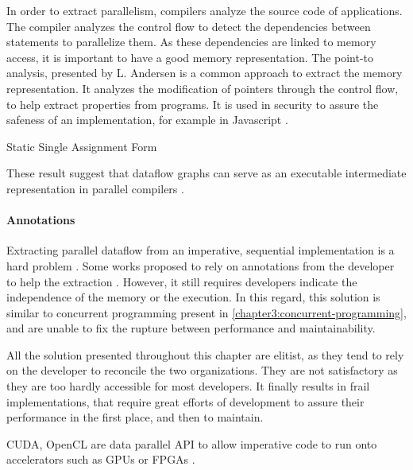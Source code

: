 In order to extract parallelism, compilers analyze the source code of applications.
The compiler analyzes the control flow to detect the dependencies between statements to parallelize them.
As these dependencies are linked to memory access, it is important to have a good memory representation.
The point-to analysis, presented by L. Andersen \cite{Andersen1994} is a common approach to extract the memory representation.
It analyzes the modification of pointers through the control flow, to help extract properties from programs.
It is used in security to assure the safeness of an implementation, for example in Javascript \cite{Chudnov2015}.


Static Single Assignment Form

These result suggest that dataflow graphs can serve as an executable intermediate representation in parallel compilers \cite{Beck1991}.


\paragraph{Annotations}

Extracting parallel dataflow from an imperative, sequential implementation is a hard problem \cite{Johnston2004a}.
Some works proposed to rely on annotations from the developer to help the extraction \cite{Vandierendonck2010a,Fernandez2014a}.
However, it still requires developers indicate the independence of the memory or the execution.
In this regard, this solution is similar to concurrent programming present in \ref{chapter3:concurrent-programming}, and are unable to fix the rupture between performance and maintainability.

All the solution presented throughout this chapter are elitist, as they tend to rely on the developer to reconcile the two organizations.
They are not satisfactory as they are too hardly accessible for most developers.
It finally results in frail implementations, that require great efforts of development to assure their performance in the first place, and then to maintain.



CUDA, OpenCL are data parallel API to allow imperative code to run onto accelerators such as GPUs or FPGAs \cite{Stone2010}.

